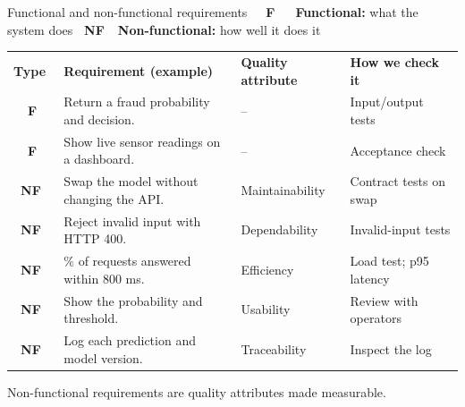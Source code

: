 \newcommand{\Ftag}{\colorbox{courseblue}{\color{white}\bfseries\scriptsize\ \ F\ \ }}
\newcommand{\NFtag}{\colorbox{coursegold}{\color{white}\bfseries\scriptsize\ NF\ }}
\begin{cframe}{Functional and non-functional requirements}{}
\centering
{\small \Ftag\ \textbf{Functional:} what the system does \qquad\quad \NFtag\ \textbf{Non-functional:} how well it does it}

\vspace{0.6em}
\renewcommand{\arraystretch}{1.25}
\setlength{\tabcolsep}{5pt}
{\footnotesize
\begin{tabularx}{\textwidth}{>{\centering\arraybackslash}p{1.0cm} >{\raggedright\arraybackslash}X >{\raggedright\arraybackslash}p{2.5cm} >{\raggedright\arraybackslash}p{3.4cm}}
\rowcolor{courseblue}
\color{white}\textbf{Type} & \color{white}\textbf{Requirement (example)} & \color{white}\textbf{Quality attribute} & \color{white}\textbf{How we check it} \\
\rowcolor{courseice}
\Ftag & Return a fraud probability and decision. & \textcolor{coursegray}{--} & Input/output tests \\
\rowcolor{courseice}
\Ftag & Show live sensor readings on a dashboard. & \textcolor{coursegray}{--} & Acceptance check \\
\rowcolor{coursegold!12}
\NFtag & Swap the model without changing the API. & Maintainability & Contract tests on swap \\
\rowcolor{coursegold!5}
\NFtag & Reject invalid input with HTTP 400. & Dependability & Invalid-input tests \\
\rowcolor{coursegold!12}
\NFtag & 95\% of requests answered within 800 ms. & Efficiency & Load test; p95 latency \\
\rowcolor{coursegold!5}
\NFtag & Show the probability and threshold. & Usability & Review with operators \\
\rowcolor{coursegold!12}
\NFtag & Log each prediction and model version. & Traceability & Inspect the log \\
\end{tabularx}}

\vspace{0.5em}
{\small Non-functional requirements are quality attributes made measurable.}
\end{cframe}

